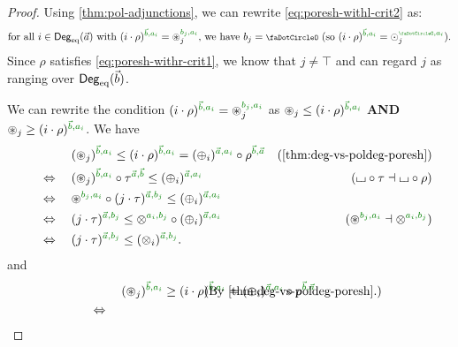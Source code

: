 \documentclass[a4paper]{memoir}
\begin{document}
\begin{proof}
	Using \cref{thm:pol-adjunctions}, we can rewrite \cref{eq:poresh-withl-crit2} as:
	\begin{align*}
		\text{for all } i \in \Degeq(\vec a) \text{ with } (i \cdot \rho)\pmrhom{\vec b}{a_i} = \isopol_j\pmrhom{b_j}{a_i} \text{, we have } b_j = \npolar \text{ (so $(i \cdot \rho)\pmrhom{\vec b}{a_i} = \nonpol_j\pmrhom{\npolar}{a_i}$)}.
	\end{align*}
	Since $\rho$ satisfies \cref{eq:poresh-withr-crit1}, we know that $j \neq \top$ and can regard $j$ as ranging over ${\mathsf{Deg}_{\mathrm{eq}}}(\vec b)$.
	
	We can rewrite the condition $(i \cdot \rho)\pmrhom{\vec b}{a_i} = \isopol_j\pmrhom{b_j}{a_i}$ as $\isopol_j \leq (i \cdot \rho)\pmrhom{\vec b}{a_i}$ \textbf{AND} $\isopol_j \geq (i \cdot \rho)\pmrhom{\vec b}{a_i}$.
	We have
	\begin{align*}
		&\quad\mathrel{\phantom{\Leftrightarrow}}\quad
		(\isopol_j)\pmrhom{\vec b}{a_i}
		\leq (i \cdot \rho)\pmrhom{\vec b}{a_i}
		= (\pospol_i)\pmrhom{\vec a}{a_i} \circ \rho\pmrhom{\vec b}{\vec a}
		& \text{(\cref{thm:deg-vs-poldeg-poresh})}
		\\ &\quad\Leftrightarrow\quad
		(\isopol_j)\pmrhom{\vec b}{a_i} \circ \tau\pmrhom{\vec a}{\vec b}
		\leq (\pospol_i)\pmrhom{\vec a}{a_i}
		& \text{($\loch \circ \tau \dashv \loch \circ \rho$)}
		\\ &\quad\Leftrightarrow\quad
		\isopol\pmrhom{b_j}{a_i} \circ (j \cdot \tau)\pmrhom{\vec a}{b_j}
		\leq (\pospol_i)\pmrhom{\vec a}{a_i}
		\\ &\quad\Leftrightarrow\quad
		(j \cdot \tau)\pmrhom{\vec a}{b_j}
		\leq \mixpol\pmrhom{a_i}{b_j} \circ (\pospol_i)\pmrhom{\vec a}{a_i}
		& \text{($\isopol\pmrhom{b_j}{a_i} \dashv \mixpol\pmrhom{a_i}{b_j}$)}
		\\ &\quad\Leftrightarrow\quad
		(j \cdot \tau)\pmrhom{\vec a}{b_j}
		\leq (\mixpol_i)\pmrhom{\vec a}{b_j}.
	\end{align*}
	and
	\begin{align*}
		&\quad\mathrel{\phantom{\Leftrightarrow}}\quad
		(\isopol_j)\pmrhom{\vec b}{a_i}
		\geq (i \cdot \rho)\pmrhom{\vec b}{a_i}
		= (\pospol_i)\pmrhom{\vec a}{a_i} \circ \rho\pmrhom{\vec b}{\vec a}
		\hspace{-10em}
		& \text{(By \cref{thm:deg-vs-poldeg-poresh}.)}
		\\ &\quad\Leftrightarrow\quad

\end{align*}
\end{proof}
\end{document}
